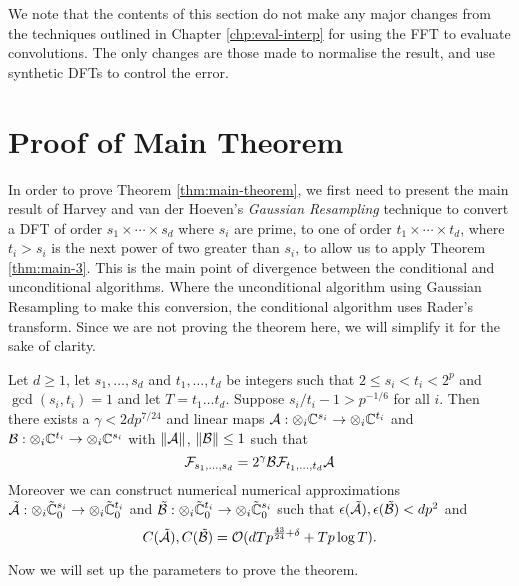 We note that the contents of this section do not make any major changes from the techniques outlined in Chapter \ref{chp:eval-interp} for using the FFT to evaluate convolutions. The only changes are those made to normalise the result, and use synthetic DFTs to control the error. 

\section{Proof of Main Theorem}%
\label{sec:proof-of-main-theorem}

In order to prove Theorem \ref{thm:main-theorem}, we first need to present the main result of Harvey and van der Hoeven's \emph{Gaussian Resampling} technique to convert a DFT of order $s_1 \times \cdots \times s_d$ where $s_i$ are prime, to one of order $t_1 \times \cdots \times t_d$, where $t_i > s_i$ is the next power of two greater than $s_i$, to allow us to apply Theorem \ref{thm:main-3}. This is the main point of divergence between the conditional and unconditional algorithms. Where the unconditional algorithm using Gaussian Resampling to make this conversion, the conditional algorithm uses Rader's transform. Since we are not proving the theorem here, we will simplify it for the sake of clarity.

\begin{theorem}\label{thm:gaussian}
    Let $d \geq 1$, let $s_1, \ldots, s_d$ and $t_1, \ldots, t_d$ be integers such that $2 \leq s_i < t_i < 2^p$ and $\gcd(s_i, t_i) = 1$ and let $T = t_1\ldots t_d$. Suppose $s_i/t_i - 1 > p^{-1/6}$ for all $i$. Then there exists a $\gamma < 2dp^{7/24}$ and linear maps $\mathcal A: \otimes_i {\mathbb C}^{s_i} \to \otimes_i {\mathbb C}^{t_i}$ and $\mathcal B: \otimes_i {\mathbb C}^{t_i} \to \otimes_i {\mathbb C}^{s_i}$ with $\|\mathcal A\|$, $\|\mathcal B\| \leq 1$ such that
    \[
        \mathcal F_{s_1, \ldots, s_d} = 2^\gamma \mathcal B \mathcal F_{t_1, \ldots, t_d} \mathcal A
    \]
    Moreover we can construct numerical numerical approximations $\tilde{\mathcal A}: \otimes_i \tilde{{\mathbb C}}^{s_i}_0 \to \otimes_i \tilde{{\mathbb C}}^{t_i}_0$ and $\tilde{\mathcal B}: \otimes_i \tilde{{\mathbb C}}^{t_i}_0 \to \otimes_i \tilde{{\mathbb C}}^{s_i}_0$  such that $\epsilon(\tilde{\mathcal A}), \epsilon(\tilde{\mathcal B}) < dp^2$ and
    \[
        C(\tilde{\mathcal A}), C(\tilde{\mathcal B}) = \mathcal O(dTp^{\frac{43}{24} + \delta} + Tp\log T).
    \]
\end{theorem}

\medskip

Now we will set up the parameters to prove the theorem.

